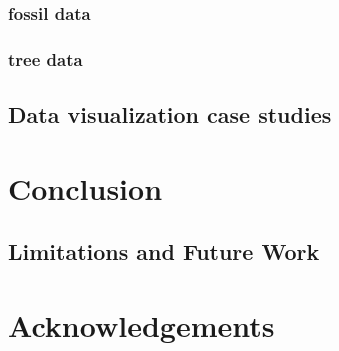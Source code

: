 \documentclass[11pt, a4paper,oneside,chapterprefix=false]{scrbook}
\begin{document}
\subsection{fossil data} \label{subsec:data_analysis_fossil}
\subsection{tree data} \label{subsec:data_analysis_tree}

\section{Data visualization case studies} \label{sec:result_data_visualization}
\chapter{Conclusion} \label{chp:discussion_conclusion}



\section{Limitations and Future Work}

\chapter*{Acknowledgements}





\listoffigures
\listoftables
\end{document}

